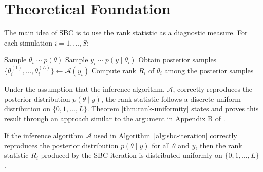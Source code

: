 \section{Theoretical Foundation}
\label{sec:theoretical_foundation}

The main idea of SBC is to use the rank statistic as a diagnostic measure.
For each simulation $i = 1, \dots, S$:

\begin{algorithm}[!ht]
    Sample $\theta_i \sim p(\theta)$\;
    Sample $y_i \sim p(y \mid \theta_i)$\;
    Obtain posterior samples $\{\theta_i^{(1)},\dots,\theta_i^{(L)}\} \gets \mathcal{A}(y_i)$\;
    Compute rank $R_i$ of $\theta_i$ among the posterior samples\;
    \caption{
        \textbf{Single iteration of the SBC procedure}.
        For each simulation, sample parameters from the prior, generate synthetic data, run inference, and compute the rank statistic.
    }
    \label{alg:sbc-iteration}
\end{algorithm}

Under the assumption that the inference algorithm, $\mathcal{A}$, correctly reproduces the posterior distribution $p(\theta \mid y)$, the rank statistic follows a discrete uniform distribution on $\{0, 1, \dots, L\}$.
Theorem \ref{thm:rank-uniformity} states and proves this result through an approach similar to the argument in Appendix B of \textcite{talts_2020}.
\begin{theorem}
    If the inference algorithm $\mathcal{A}$ used in Algorithm~\ref{alg:sbc-iteration} correctly reproduces the posterior distribution $p(\theta \mid y)$ for all $\theta$ and $y$, then the rank statistic $R_i$ produced by the SBC iteration is distributed uniformly on $\{0,1,\dots,L\}$.
    \label{thm:rank-uniformity}
\end{theorem}

